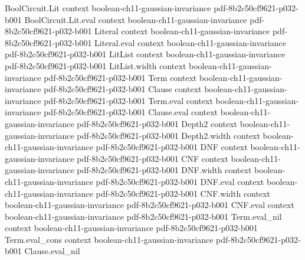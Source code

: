 \begin{lemma}
\label{BooleanAnalysis.GaussianSpace.hermiteCoeff_hermiteFunction}
\leanok
{}
\proofstep
  {BoolCircuit.Lit}
  {context}
  {boolean-ch11-gaussian-invariance}
  {pdf-8b2c50cf9621-p032-b001}
\proofstep
  {BoolCircuit.Lit.eval}
  {context}
  {boolean-ch11-gaussian-invariance}
  {pdf-8b2c50cf9621-p032-b001}
\proofstep
  {Literal}
  {context}
  {boolean-ch11-gaussian-invariance}
  {pdf-8b2c50cf9621-p032-b001}
\proofstep
  {Literal.eval}
  {context}
  {boolean-ch11-gaussian-invariance}
  {pdf-8b2c50cf9621-p032-b001}
\proofstep
  {LitList}
  {context}
  {boolean-ch11-gaussian-invariance}
  {pdf-8b2c50cf9621-p032-b001}
\proofstep
  {LitList.width}
  {context}
  {boolean-ch11-gaussian-invariance}
  {pdf-8b2c50cf9621-p032-b001}
\proofstep
  {Term}
  {context}
  {boolean-ch11-gaussian-invariance}
  {pdf-8b2c50cf9621-p032-b001}
\proofstep
  {Clause}
  {context}
  {boolean-ch11-gaussian-invariance}
  {pdf-8b2c50cf9621-p032-b001}
\proofstep
  {Term.eval}
  {context}
  {boolean-ch11-gaussian-invariance}
  {pdf-8b2c50cf9621-p032-b001}
\proofstep
  {Clause.eval}
  {context}
  {boolean-ch11-gaussian-invariance}
  {pdf-8b2c50cf9621-p032-b001}
\proofstep
  {Depth2}
  {context}
  {boolean-ch11-gaussian-invariance}
  {pdf-8b2c50cf9621-p032-b001}
\proofstep
  {Depth2.width}
  {context}
  {boolean-ch11-gaussian-invariance}
  {pdf-8b2c50cf9621-p032-b001}
\proofstep
  {DNF}
  {context}
  {boolean-ch11-gaussian-invariance}
  {pdf-8b2c50cf9621-p032-b001}
\proofstep
  {CNF}
  {context}
  {boolean-ch11-gaussian-invariance}
  {pdf-8b2c50cf9621-p032-b001}
\proofstep
  {DNF.width}
  {context}
  {boolean-ch11-gaussian-invariance}
  {pdf-8b2c50cf9621-p032-b001}
\proofstep
  {DNF.eval}
  {context}
  {boolean-ch11-gaussian-invariance}
  {pdf-8b2c50cf9621-p032-b001}
\proofstep
  {CNF.width}
  {context}
  {boolean-ch11-gaussian-invariance}
  {pdf-8b2c50cf9621-p032-b001}
\proofstep
  {CNF.eval}
  {context}
  {boolean-ch11-gaussian-invariance}
  {pdf-8b2c50cf9621-p032-b001}
\proofstep
  {Term.eval_nil}
  {context}
  {boolean-ch11-gaussian-invariance}
  {pdf-8b2c50cf9621-p032-b001}
\proofstep
  {Term.eval_cons}
  {context}
  {boolean-ch11-gaussian-invariance}
  {pdf-8b2c50cf9621-p032-b001}
\proofstep
  {Clause.eval_nil}

\end{lemma}
